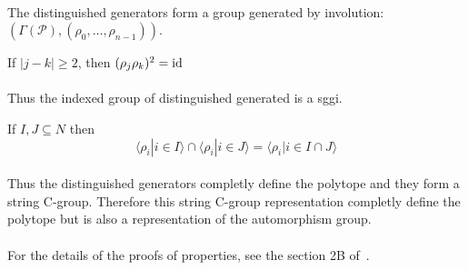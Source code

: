 \paragraph{}
The distinguished generators form a group generated by involution: $(\Gamma(\mathcal P), (\rho_0, \dots, \rho_{n-1}))$.

\begin{property}
  If $|j - k| \ge 2$, then $(\rho_j \rho_k)^2 = \operatorname{id}$
\end{property}

\paragraph{}
Thus the indexed group of distinguished generated is a sggi.

\begin{property}
  If $I, J \subseteq N$ then
  \[
    \langle \rho_i | i \in I \rangle \cap \langle \rho_i | i \in J \rangle = \langle \rho_i | i \in I \cap J \rangle
  \]
\end{property}

\paragraph{}
Thus the distinguished generators completly define the polytope and they form a string C-group. Therefore this string C-group representation completly define the polytope but is also a representation of the automorphism group.

\paragraph{}
For the details of the proofs of properties, see the section 2B of~\cite{abstractRegularPolytopes}.
